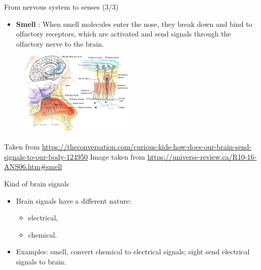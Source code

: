 \documentclass{beamer}
\begin{document}
\begin{frame}
{\centerline{From nervous system to senses (3/3)}}
\begin{itemize}
    \item \textbf{Smell} : When smell molecules enter the nose, they break down and bind to olfactory receptors, which are activated and send signals through the olfactory nerve to the brain.
\end{itemize}
\begin{figure}
    \centering
    \includegraphics[height=4cm]{P2023.AIBCCSS.BrainSignals/smell.jpg}
\end{figure}
\begin{center}
    \tiny{Taken from \url{https://theconversation.com/curious-kids-how-does-our-brain-send-signals-to-our-body-124950}}
    \tiny{Image taken from \url{https://universe-review.ca/R10-16-ANS06.htm\#smell}}
\end{center}    

\end{frame}


\begin{frame}
{\centerline{Kind of brain signals}}
\begin{itemize}
    \item Brain signals have a different nature:
    \begin{itemize}
        \item electrical,
        \item chemical.
    \end{itemize}
    \item Examples: smell, convert chemical to electrical signals; sight send electrical signals to brain.
\end{itemize}


\end{frame}
\end{document}
